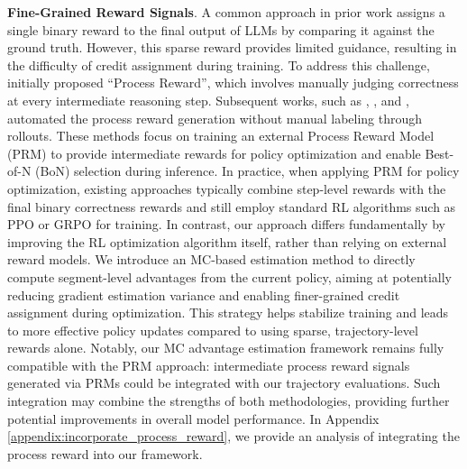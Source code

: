 \textbf{Fine-Grained Reward Signals}. 
A common approach in prior work assigns a single binary reward to the final output of LLMs by comparing it against the ground truth. However, this sparse reward provides limited guidance, resulting in the difficulty of credit assignment during training. To address this challenge, \cite{lightman2023letsverifystepstep} initially proposed ``Process Reward'', which involves manually judging correctness at every intermediate reasoning step. Subsequent works, such as \cite{wang2024mathshepherdverifyreinforcellms}, \cite{luo2024improvemathematicalreasoninglanguage}, and \cite{ma2023letsrewardstepstep}, automated the process reward generation without manual labeling through rollouts. These methods focus on training an external Process Reward Model (PRM) to provide intermediate rewards for policy optimization and enable Best-of-N (BoN) selection during inference. In practice, when applying PRM for policy optimization, existing approaches typically combine step-level rewards with the final binary correctness rewards and still employ standard RL algorithms such as PPO or GRPO for training. In contrast, our approach differs fundamentally by improving the RL optimization algorithm itself, rather than relying on external reward models.  We introduce an MC-based estimation method to directly compute segment-level advantages from the current policy, aiming at potentially reducing gradient estimation variance and enabling finer-grained credit assignment during optimization. This strategy helps stabilize training and leads to more effective policy updates compared to using sparse, trajectory-level rewards alone.  Notably, our MC advantage estimation framework remains fully compatible with the PRM approach: intermediate process reward signals generated via PRMs could be integrated with our trajectory evaluations. Such integration may combine the strengths of both methodologies, providing further potential improvements in overall model performance. In Appendix \ref{appendix:incorporate_process_reward}, we provide an analysis of integrating the process reward into our framework.